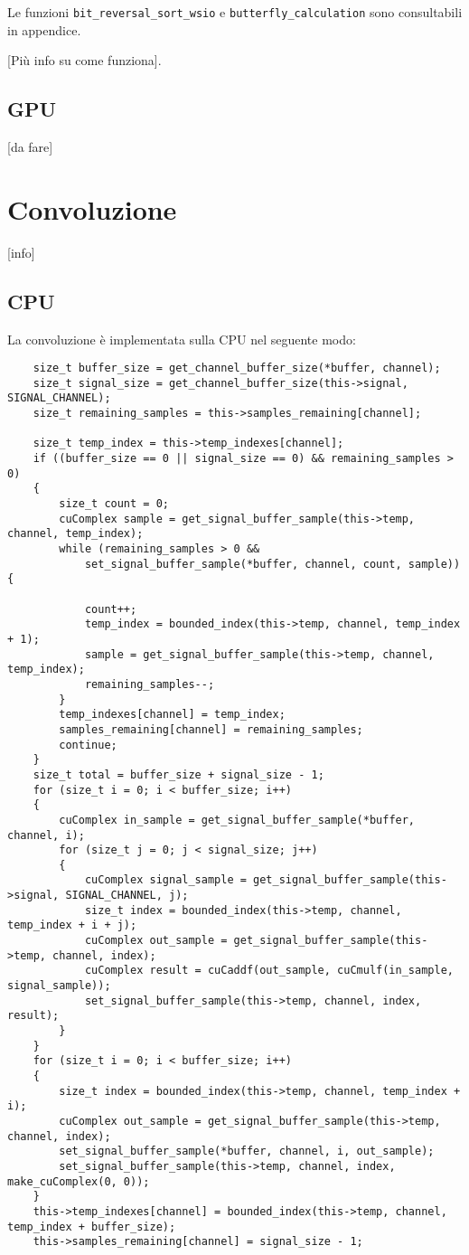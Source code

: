 Le funzioni \lstinline{bit_reversal_sort_wsio} e \lstinline{butterfly_calculation} sono consultabili in appendice.

[Più info su come funziona].

\subsection{GPU}

[da fare]

\section{Convoluzione}
[info]
\subsection{CPU}
La convoluzione è implementata sulla CPU nel seguente modo:

\begin{lstlisting}
    size_t buffer_size = get_channel_buffer_size(*buffer, channel);
    size_t signal_size = get_channel_buffer_size(this->signal, SIGNAL_CHANNEL);
    size_t remaining_samples = this->samples_remaining[channel];

    size_t temp_index = this->temp_indexes[channel];
    if ((buffer_size == 0 || signal_size == 0) && remaining_samples > 0)
    {
        size_t count = 0;
        cuComplex sample = get_signal_buffer_sample(this->temp, channel, temp_index);
        while (remaining_samples > 0 &&
            set_signal_buffer_sample(*buffer, channel, count, sample)) {

            count++;
            temp_index = bounded_index(this->temp, channel, temp_index + 1);
            sample = get_signal_buffer_sample(this->temp, channel, temp_index);
            remaining_samples--;
        }
        temp_indexes[channel] = temp_index;
        samples_remaining[channel] = remaining_samples;
        continue;
    }
    size_t total = buffer_size + signal_size - 1;
    for (size_t i = 0; i < buffer_size; i++)
    {
        cuComplex in_sample = get_signal_buffer_sample(*buffer, channel, i);
        for (size_t j = 0; j < signal_size; j++)
        {
            cuComplex signal_sample = get_signal_buffer_sample(this->signal, SIGNAL_CHANNEL, j);
            size_t index = bounded_index(this->temp, channel, temp_index + i + j);
            cuComplex out_sample = get_signal_buffer_sample(this->temp, channel, index);
            cuComplex result = cuCaddf(out_sample, cuCmulf(in_sample, signal_sample));
            set_signal_buffer_sample(this->temp, channel, index, result);
        }
    }
    for (size_t i = 0; i < buffer_size; i++)
    {
        size_t index = bounded_index(this->temp, channel, temp_index + i);
        cuComplex out_sample = get_signal_buffer_sample(this->temp, channel, index);
        set_signal_buffer_sample(*buffer, channel, i, out_sample);
        set_signal_buffer_sample(this->temp, channel, index, make_cuComplex(0, 0));
    }
    this->temp_indexes[channel] = bounded_index(this->temp, channel, temp_index + buffer_size);
    this->samples_remaining[channel] = signal_size - 1;
\end{lstlisting}


